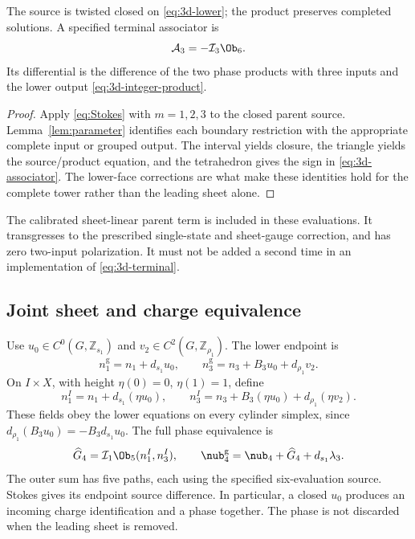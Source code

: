 \begin{theorem}\label{thm:canonical}
The source is twisted closed on \eqref{eq:3d-lower}; the product preserves completed solutions. A specified terminal associator is
\begin{equation}\label{eq:3d-associator}
 \mathcal A_3=-\mathcal I_3\Ob_6.
\end{equation}
Its differential is the difference of the two phase products with three inputs and the lower output \eqref{eq:3d-integer-product}.
\end{theorem}
\begin{proof}
Apply \eqref{eq:Stokes} with $m=1,2,3$ to the closed parent source. Lemma~\ref{lem:parameter} identifies each boundary restriction with the appropriate complete input or grouped output. The interval yields closure, the triangle yields the source/product equation, and the tetrahedron gives the sign in \eqref{eq:3d-associator}. The lower-face corrections are what make these identities hold for the complete tower rather than the leading sheet alone.
\end{proof}
The calibrated sheet-linear parent term is included in these evaluations. It transgresses to the prescribed single-state and sheet-gauge correction, and has zero two-input polarization. It must not be added a second time in an implementation of \eqref{eq:3d-terminal}.

\subsection{Joint sheet and charge equivalence}\label{subsec:gauge3}
Use $u_0\in C^0(G,\mathbb Z_{s_1})$ and $v_2\in C^2(G,\mathbb Z_{\rho_1})$. The lower endpoint is
\begin{equation}\label{eq:3d-gauge}
 \boxed{n_1^{\mathrm g}=n_1+d_{s_1}u_0,\qquad
 n_3^{\mathrm g}=n_3+B_3u_0+d_{\rho_1}v_2.}
\end{equation}
On $I\times X$, with height $\eta(0)=0$, $\eta(1)=1$, define
\begin{equation}\label{eq:3d-cylinder}
 n_1^I=n_1+d_{s_1}(\eta u_0),\qquad
 n_3^I=n_3+B_3(\eta u_0)+d_{\rho_1}(\eta v_2).
\end{equation}
These fields obey the lower equations on every cylinder simplex, since
$d_{\rho_1}(B_3u_0)=-B_3d_{s_1}u_0$. The full phase equivalence is
\begin{equation}\label{eq:3d-gauge-phase}
 \widehat G_4=\mathcal I_1\Ob_5(n_1^I,n_3^I),\qquad
 \nub_4^{\mathrm g}=\nub_4+\widehat G_4+d_{s_1}\lambda_3.
\end{equation}
The outer sum has five paths, each using the specified six-evaluation source. Stokes gives its endpoint source difference. In particular, a closed $u_0$ produces an incoming charge identification and a phase together. The phase is not discarded when the leading sheet is removed.

